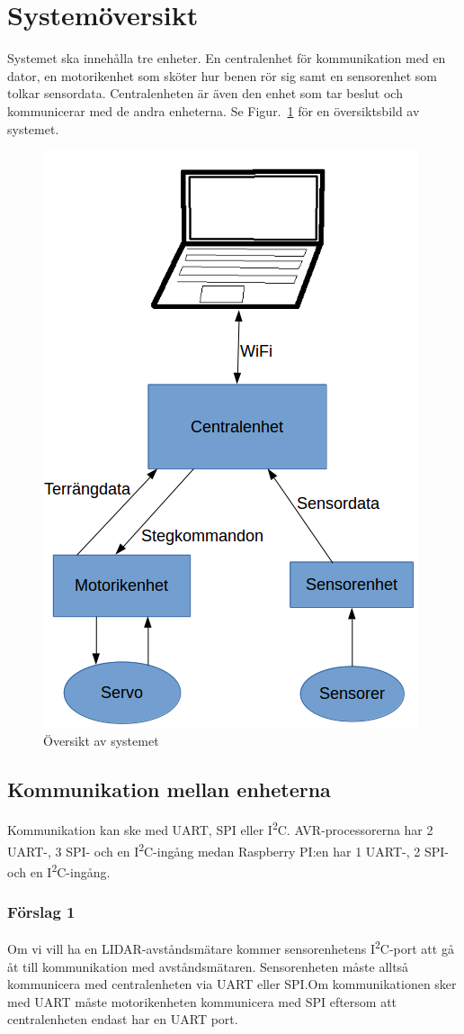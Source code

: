 \documentclass[a4paper,titlepage,12pt]{article}
\newcommand{\itc}{I\textsuperscript{2}C}
\begin{document}
	\section{Systemöversikt}
	Systemet ska innehålla tre enheter. En centralenhet för kommunikation med en
    dator, en motorikenhet som sköter hur benen rör sig samt en sensorenhet som
    tolkar sensordata. Centralenheten är även den enhet som tar beslut och
    kommunicerar med de andra enheterna. Se Figur.~\ref{fig:overview} för en översiktsbild av
    systemet.
	\begin{figure}[h]
		\centering
		\includegraphics[width=0.5\linewidth]{../images/overview.png}
		\caption{Översikt av systemet\label{fig:overview}}
	\end{figure}

	\subsection{Kommunikation mellan enheterna}
	Kommunikation kan ske med UART, SPI eller \itc{}. AVR-processorerna har
	2 UART-, 3 SPI- och en \itc{}-ingång medan Raspberry PI:en har 1 UART-, 2 SPI- och
	en \itc{}-ingång. 

	\subsubsection{Förslag 1}
	Om vi vill ha en LIDAR-avståndsmätare kommer sensorenhetens \itc{}-port att gå åt
	till kommunikation med avståndsmätaren. Sensorenheten måste alltså kommunicera med
	centralenheten via UART eller SPI.\@ Om kommunikationen sker med UART måste 
	motorikenheten kommunicera med SPI eftersom att centralenheten endast har en
	UART port.
\end{document}
